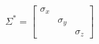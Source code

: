 \begin{equation}
    \Sigma^* = \left[
    \begin{array}{ccc}
    \sigma_x & & \\
    & \sigma_y & \\
    & & \sigma_z
    \end{array}
    \right]
    \label{eq:diagonal_sigma_e}
\end{equation}
